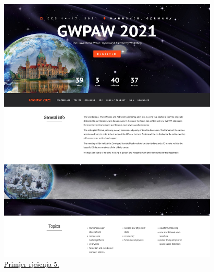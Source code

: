 		
		\begin{figure}[H]
			\begin{minipage}[t]{0.4\textwidth}
				\includegraphics[width=\linewidth]{slike/frontpage_example5}
				\caption{\href{https://gwpaw2021.aei.mpg.de/}{Primjer rješenja 5.}} \label{fig:frontpage_example5}
			\end{minipage}
			\hspace*{\fill}
			\begin{minipage}[t]{0.4\textwidth}

\end{minipage}
\end{figure}
